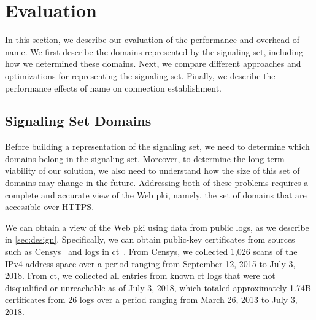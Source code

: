 \section{Evaluation}
\label{sec:evaluation}

In this section, we describe our evaluation of the performance and overhead of
\ac{name}. We first describe the domains represented by the signaling set,
including how we determined these domains. Next, we compare different approaches
and optimizations for representing the signaling set. Finally, we describe the
performance effects of \ac{name} on connection establishment.

\subsection{Signaling Set Domains}
\label{sec:evaluation:https}

Before building a representation of the signaling set, we need to determine
which domains belong in the signaling set. Moreover, to determine the long-term
viability of our solution, we also need to understand how the size of this set
of domains may change in the future. Addressing both of these problems requires
a complete and accurate view of the Web \ac{pki}, namely, the set of domains
that are accessible over HTTPS.

We can obtain a view of the Web \ac{pki} using data from public logs, as we
describe in \autoref{sec:design}. Specifically, we can obtain public-key
certificates from sources such as Censys~\cite{durumeric2015search} and logs in
\ac{ct}~\cite{rfc6962}. From Censys, we collected 1,026 scans of the IPv4
address space over a period ranging from September 12, 2015 to July 3, 2018.
From \ac{ct}, we collected all entries from known \ac{ct} logs that were not
disqualified or unreachable as of July 3,
2018, which
totaled approximately 1.74B certificates from 26 logs over a period ranging from
March 26, 2013 to July 3, 2018.

